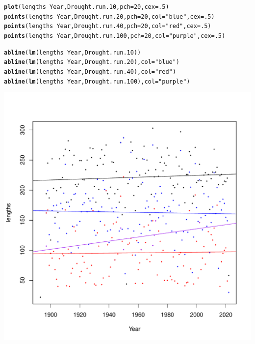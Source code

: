 \documentclass{article}\usepackage[]{graphicx}\usepackage[]{color}
\makeatletter
\def\maxwidth{ %
  \ifdim\Gin@nat@width>\linewidth
    \linewidth
  \else
    \Gin@nat@width
  \fi
}
\newcommand{\hlnum}[1]{\textcolor[rgb]{0.686,0.059,0.569}{#1}}%
\newcommand{\hlstr}[1]{\textcolor[rgb]{0.192,0.494,0.8}{#1}}%
\newcommand{\hlopt}[1]{\textcolor[rgb]{0,0,0}{#1}}%
\newcommand{\hlstd}[1]{\textcolor[rgb]{0.345,0.345,0.345}{#1}}%
\newcommand{\hlkwc}[1]{\textcolor[rgb]{0.333,0.667,0.333}{#1}}%
\newcommand{\hlkwd}[1]{\textcolor[rgb]{0.737,0.353,0.396}{\textbf{#1}}}%
\newenvironment{kframe}{%
 \def\at@end@of@kframe{}%
 \ifinner\ifhmode%
  \def\at@end@of@kframe{\end{minipage}}%
  \begin{minipage}{\columnwidth}%
 \fi\fi%
 \def\FrameCommand##1{\hskip\@totalleftmargin \hskip-\fboxsep
 \colorbox{shadecolor}{##1}\hskip-\fboxsep
     \hskip-\linewidth \hskip-\@totalleftmargin \hskip\columnwidth}%
 \MakeFramed {\advance\hsize-\width
   \@totalleftmargin\z@ \linewidth\hsize
   \@setminipage}}%
 {\par\unskip\endMakeFramed%
 \at@end@of@kframe}
\newenvironment{knitrout}{}{} %
\makeatother
\begin{document}
\begin{knitrout}
\begin{kframe}
\begin{alltt}
\hlkwd{plot}\hlstd{(lengths}\hlopt{~}\hlstd{Year, Drought.run.10,} \hlkwc{pch}\hlstd{=}\hlnum{20}\hlstd{,} \hlkwc{cex}\hlstd{=}\hlnum{.5}\hlstd{)}
\hlkwd{points}\hlstd{(lengths}\hlopt{~}\hlstd{Year, Drought.run.20,} \hlkwc{pch}\hlstd{=}\hlnum{20}\hlstd{,} \hlkwc{col}\hlstd{=}\hlstr{"blue"}\hlstd{,} \hlkwc{cex}\hlstd{=}\hlnum{.5}\hlstd{)}
\hlkwd{points}\hlstd{(lengths}\hlopt{~}\hlstd{Year, Drought.run.40,} \hlkwc{pch}\hlstd{=}\hlnum{20}\hlstd{,} \hlkwc{col}\hlstd{=}\hlstr{"red"}\hlstd{,} \hlkwc{cex}\hlstd{=}\hlnum{.5}\hlstd{)}
\hlkwd{points}\hlstd{(lengths}\hlopt{~}\hlstd{Year, Drought.run.100,} \hlkwc{pch}\hlstd{=}\hlnum{20}\hlstd{,} \hlkwc{col}\hlstd{=}\hlstr{"purple"}\hlstd{,} \hlkwc{cex}\hlstd{=}\hlnum{.5}\hlstd{)}

\hlkwd{abline}\hlstd{(}\hlkwd{lm}\hlstd{(lengths}\hlopt{~}\hlstd{Year, Drought.run.10))}
\hlkwd{abline}\hlstd{(}\hlkwd{lm}\hlstd{(lengths}\hlopt{~}\hlstd{Year, Drought.run.20),} \hlkwc{col}\hlstd{=}\hlstr{"blue"}\hlstd{)}
\hlkwd{abline}\hlstd{(}\hlkwd{lm}\hlstd{(lengths}\hlopt{~}\hlstd{Year, Drought.run.40),} \hlkwc{col}\hlstd{=}\hlstr{"red"}\hlstd{)}
\hlkwd{abline}\hlstd{(}\hlkwd{lm}\hlstd{(lengths}\hlopt{~}\hlstd{Year, Drought.run.100),} \hlkwc{col}\hlstd{=}\hlstr{"purple"}\hlstd{)}
\end{alltt}
\end{kframe}
\includegraphics[width=\maxwidth]{figure/unnamed-chunk-12-1} 

\end{knitrout}
\end{document}
